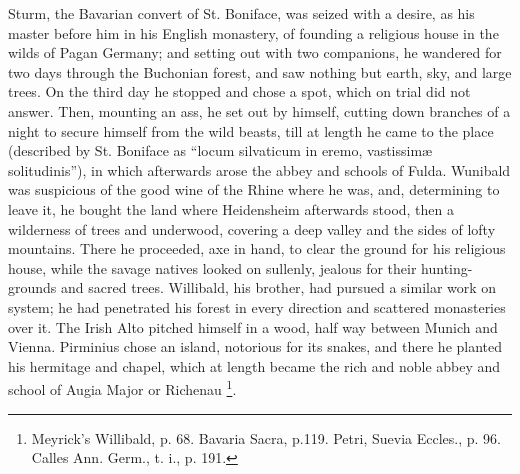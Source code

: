 Sturm, the Bavarian convert of St. Boniface, was seized with a
desire, as his master before him in his English monastery, of founding
a religious house in the wilds of Pagan Germany; and setting out with
two companions, he wandered for two days through the Buchonian forest,
and saw nothing but earth, sky, and large trees. On the third day he
stopped and chose a spot, which on trial did not answer. Then,
mounting an ass, he set out by himself, cutting down branches of a
night to secure himself from the wild beasts, till at length he came
to the place (described by St. Boniface as ``locum silvaticum in
eremo, vastissimæ solitudinis''), in which afterwards arose the
abbey and schools of Fulda. Wunibald was suspicious of the good wine
of the Rhine where he was, and, determining to leave it, he bought the
land where Heidensheim afterwards stood, then a wilderness of trees
and underwood, covering a deep valley and the sides of lofty
mountains. There he proceeded, axe in hand, to clear the ground for
his religious house, while the savage natives looked on sullenly,
jealous for their hunting-grounds and sacred trees. Willibald, his brother, had pursued a similar work on system; he had penetrated
his forest in every direction and scattered monasteries over it. The
Irish Alto pitched himself in a wood, half way between Munich and
Vienna. Pirminius chose an island, notorious for its snakes, and there
he planted his hermitage and chapel, which at length became the rich
and noble abbey and school of Augia Major or Richenau \footnote{Meyrick's
Willibald, p. 68. Bavaria Sacra, p.119. Petri, Suevia Eccles., p. 96.
Calles Ann. Germ., t. i., p. 191.}.

